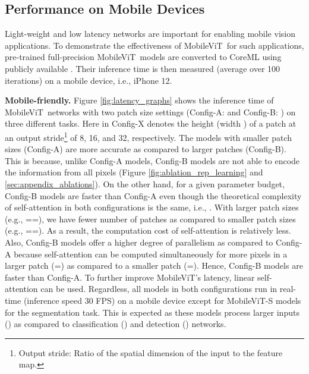 \documentclass[preprint]{article} \usepackage{iclr2022_conference,times}
\newcommand{\arch}{MobileViT}
\begin{document}
\vspace{-2mm}
\subsection{Performance on Mobile Devices}
\label{sec:mobile_friendly}
\vspace{-2mm}

Light-weight and low latency networks are important for enabling mobile vision applications. To demonstrate the effectiveness of \arch~for such applications, pre-trained full-precision \arch~models are converted to CoreML using publicly available \citet{coreml2021}. Their inference time is then measured (average over 100 iterations) on a mobile device, i.e., iPhone 12.

\textbf{Mobile-friendly.} Figure \ref{fig:latency_graphs} shows the inference time of \arch~networks with two patch size settings (Config-A:  and Config-B: ) on three different tasks. Here  in Config-X denotes the height  (width ) of a patch at an output stride\footnote{Output stride: Ratio of the spatial dimension of the input to the feature map.} of 8, 16, and 32, respectively. The models with smaller patch sizes (Config-A) are more accurate as compared to larger patches (Config-B). This is because, unlike Config-A models, Config-B models are not able to encode the information from all pixels (Figure \ref{fig:ablation_rep_learning} and \textsection \ref{sec:appendix_ablations}). On the other hand, for a given parameter budget, Config-B models are faster than Config-A even though the theoretical complexity of self-attention in both configurations is the same, i.e., . With larger patch sizes (e.g., ==), we have fewer number of patches  as compared to smaller patch sizes (e.g., ==). As a result, the computation cost of self-attention is relatively less. Also, Config-B models offer a higher degree of parallelism as compared to Config-A because self-attention can be computed simultaneously for more pixels in a larger patch (=) as compared to a smaller patch (=). Hence, Config-B models are faster than Config-A. To further improve \arch's latency, linear self-attention \citep{wang2020linformer} can be used. Regardless, all models in both configurations run in real-time (inference speed  30 FPS) on a mobile device except for \arch-S models for the segmentation task. This is expected as these models process larger inputs () as compared to classification () and detection () networks.
\end{document}
